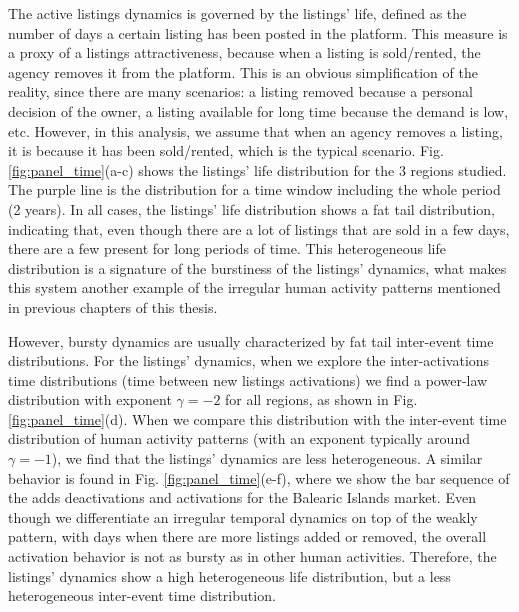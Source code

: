 The active listings dynamics is governed by the listings' life, defined as the number of days a certain listing has been posted in the platform. This measure is a proxy of a listings attractiveness, because when a listing is sold/rented, the agency removes it from the platform. This is an obvious simplification of the reality, since there are many scenarios: a listing removed because a personal decision of the owner, a listing available for long time because the demand is low, etc. However, in this analysis, we assume that when an agency removes a listing, it is because it has been sold/rented, which is the typical scenario. Fig. \ref{fig:panel_time}(a-c) shows the listings' life distribution for the 3 regions studied. The purple line is the distribution for a time window including the whole period (2 years). In all cases, the listings' life distribution shows a fat tail distribution, indicating that, even though there are a lot of listings that are sold in a few days, there are a few present for long periods of time. This heterogeneous life distribution is a signature of the burstiness of the listings' dynamics, what makes this system another example of the irregular human activity patterns mentioned in previous chapters of this thesis.

However, bursty dynamics are usually characterized by fat tail inter-event time distributions. For the listings' dynamics, when we explore the inter-activations time distributions (time between new listings activations) we find a power-law distribution with exponent $\gamma = -2$ for all regions, as shown in Fig. \ref{fig:panel_time}(d). When we compare this distribution with the inter-event time distribution of human activity patterns (with an exponent typically around $\gamma = -1$), we find that the listings' dynamics are less heterogeneous. A similar behavior is found in Fig. \ref{fig:panel_time}(e-f), where we show the bar sequence of the adds deactivations and activations for the Balearic Islands market. Even though we differentiate an irregular temporal dynamics on top of the weakly pattern, with days when there are more listings added or removed, the overall activation behavior is not as bursty as in other human activities. Therefore, the listings' dynamics show a high heterogeneous life distribution, but a less heterogeneous inter-event time distribution.


